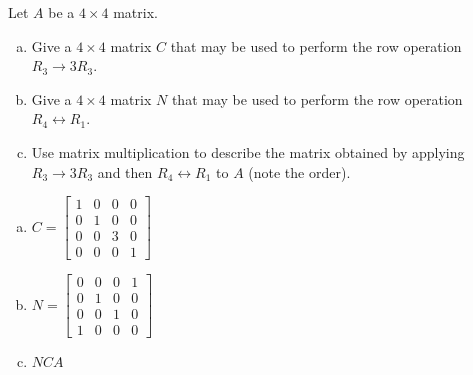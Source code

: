 
\begin{exerciseStatement}


Let \(A\) be a \(4 \times 4\) matrix.


\begin{enumerate}[(a)]
\item Give a \(4 \times 4\) matrix \(C\) that may be used to perform the row operation \( R_3 \to 3R_3 \).
\item Give a \(4 \times 4\) matrix \(N\) that may be used to perform the row operation \( R_4 \leftrightarrow R_1 \).
\item Use matrix multiplication to describe the matrix obtained by applying \( R_3 \to 3R_3 \) and then \( R_4 \leftrightarrow R_1 \) to \(A\) (note the order). 
\end{enumerate}
    
\end{exerciseStatement}
    
\begin{exerciseAnswer} 

\begin{enumerate}[(a)]
\item \(C= \left[\begin{array}{cccc}
1 & 0 & 0 & 0 \\
0 & 1 & 0 & 0 \\
0 & 0 & 3 & 0 \\
0 & 0 & 0 & 1
\end{array}\right] \)
\item \(N= \left[\begin{array}{cccc}
0 & 0 & 0 & 1 \\
0 & 1 & 0 & 0 \\
0 & 0 & 1 & 0 \\
1 & 0 & 0 & 0
\end{array}\right] \)
\item \(NCA\)
\end{enumerate}
    
\end{exerciseAnswer}
    
